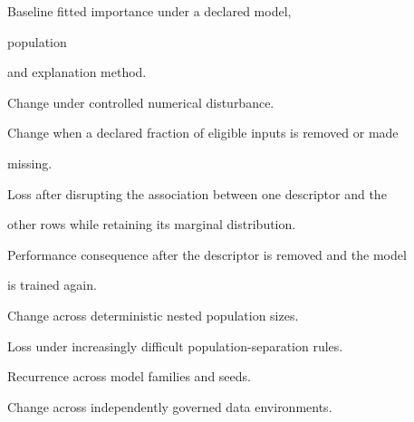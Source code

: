 \documentclass[11pt,a4paper,oneside]{report}
\begin{document}
\begin{description}[leftmargin=3.6cm,style=nextline]



\item[$I$]

Baseline fitted importance under a declared model,

population

and explanation method.



\item[$\Delta_{\mathrm{noise}}$]

Change under controlled numerical disturbance.



\item[$\Delta_{\mathrm{dropout}}$]

Change when a declared fraction of eligible inputs is removed or made

missing.



\item[$\Delta_{\mathrm{shuffle}}$]

Loss after disrupting the association between one descriptor and the

other rows while retaining its marginal distribution.



\item[$\Delta_{\mathrm{removal}}$]

Performance consequence after the descriptor is removed and the model

is trained again.



\item[$L_{\mathrm{scale}}$]

Change across deterministic nested population sizes.



\item[$L_{\mathrm{split}}$]

Loss under increasingly difficult population-separation rules.



\item[$R_{\mathrm{model}}$]

Recurrence across model families and seeds.



\item[$\Delta_{\mathrm{source}}$]

Change across independently governed data environments.



\end{description}
\end{document}
